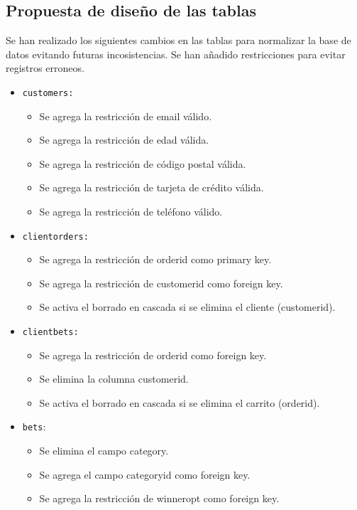 \documentclass{article}
\begin{document}
\subsection{Propuesta de diseño de las tablas}
Se han realizado los siguientes cambios en las tablas para normalizar la base de datos evitando futuras incosistencias. Se han añadido restricciones para evitar registros erroneos.
\begin{itemize}
    \item\texttt{customers:}
        \begin{itemize}
            \item Se agrega la restricción de email válido.
            \item Se agrega la restricción de edad válida.
            \item Se agrega la restricción de código postal válida.
            \item Se agrega la restricción de tarjeta de crédito válida.
            \item Se agrega la restricción de teléfono válido.
        \end{itemize}
    \item\texttt{clientorders:}
        \begin{itemize}
            \item Se agrega la restricción de orderid como primary key.
            \item Se agrega la restricción de customerid como foreign key.
            \item Se activa el borrado en cascada si se elimina el cliente (customerid).
        \end{itemize}
    \item\texttt{clientbets:}
        \begin{itemize}
            \item Se agrega la restricción de orderid como foreign key.
            \item Se elimina la columna customerid.
            \item Se activa el borrado en cascada si se elimina el carrito (orderid).
        \end{itemize}
    \item\texttt{bets}:
        \begin{itemize}
            \item Se elimina el campo category.
            \item Se agrega el campo categoryid como foreign key.
            \item Se agrega la restricción de winneropt como foreign key.

\end{itemize}
\end{itemize}
\end{document}
